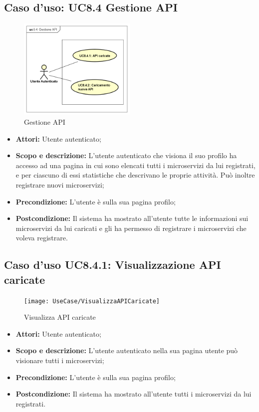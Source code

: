 \documentclass[12pt,a4paper,titlepage]{article}
\begin{document}
	\subsection{Caso d'uso: UC8.4 Gestione API}
	\label{UC8.4}
	\begin{figure}[H]
		\centering
		\includegraphics[width=0.5\textwidth]{UseCase/GestioneAPI}
		\caption{Gestione API}
	\end{figure}
	\begin{itemize}
		\item \textbf{Attori: }Utente autenticato;
		\item \textbf{Scopo e descrizione: }L'utente autenticato che visiona il suo profilo ha accesso ad una pagina in cui sono elencati tutti i microservizi da lui registrati, e per ciascuno di essi statistiche che descrivano le proprie attività. Può inoltre registrare nuovi microservizi;
		\item \textbf{Precondizione: }L'utente è sulla sua pagina profilo;
		\item \textbf{Postcondizione: }Il sistema ha mostrato all'utente tutte le informazioni sui microservizi da lui caricati e gli ha permesso di registrare i microservizi che voleva registrare.
	\end{itemize}
	\subsection{Caso d'uso UC8.4.1: Visualizzazione API caricate}
	\label{UC8.4.1}
	\begin{figure}[H]
		\centering
		\texttt{[image: UseCase/VisualizzaAPICaricate]}
		\caption{Visualizza API caricate}
	\end{figure}
	\begin{itemize}
		\item \textbf{Attori: }Utente autenticato;
		\item \textbf{Scopo e descrizione: }L'utente autenticato nella sua pagina utente può visionare tutti i microservizi;
		\item \textbf{Precondizione: }L'utente è sulla sua pagina profilo;
		\item \textbf{Postcondizione: }Il sistema ha mostrato all'utente tutti i microservizi da lui registrati.
	\end{itemize}
\end{document}
